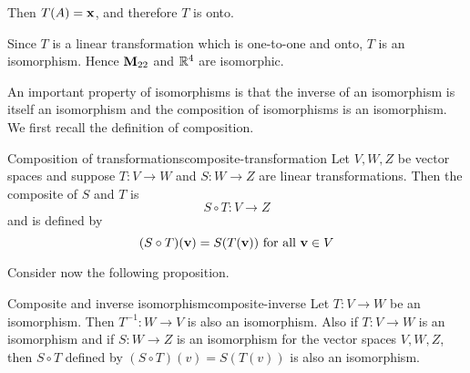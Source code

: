 \begin{solution}
Then $T(A)=\mbox{\bf x}$, and therefore $T$ is onto.

Since $T$ is a linear transformation which is one-to-one and onto, $T$ is an isomorphism. Hence $\mathbf{M}_{22}$ and $\mathbb{R}^4$ are isomorphic.
\end{solution}

An important property of isomorphisms is that the inverse of an isomorphism
is itself an isomorphism and the composition of isomorphisms is an
isomorphism. We first recall the definition of composition.

\begin{definition}{Composition of transformations}{composite-transformation}
Let $V, W, Z$ be vector spaces and suppose $T: V \to W$ and $S: W \to Z$ are linear transformations. Then the composite of $S$ and $T$ is
\[
S \circ T: V \to Z
\]
and is defined by
\[
(S \circ T) (\mbox{\bf v}) = S(T(\mbox{\bf v})) \mbox{ for all } \mbox{\bf v} \in V
\]
\end{definition}

Consider now the following proposition.

\begin{proposition}{Composite and inverse isomorphism}{composite-inverse}
Let $T:V\rightarrow W$ be an isomorphism. Then $T^{-1}:W\rightarrow V$ is
also an isomorphism. Also if $T:V\rightarrow W$ is an isomorphism and if $
S:W\rightarrow Z$ is an isomorphism for the vector spaces $V,W,Z$, then $
S\circ T$ defined by $(S\circ T) (v) = S(
T(v)) $ is also an isomorphism.
\end{proposition}

